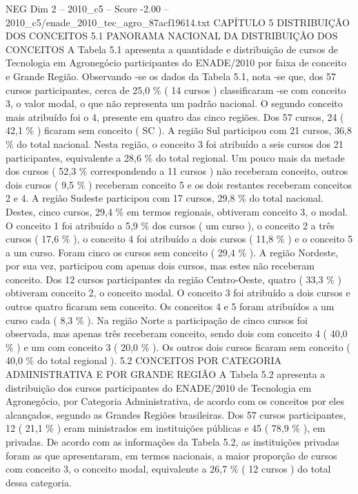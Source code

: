 \begin{textsample}{NEG Dim 2 – 2010\_c5 – Score -2.00 – 2010\_c5/enade\_2010\_tec\_agro\_87acf19614.txt}  \label{ex:f2_neg_103}
CAPÍTULO 5 DISTRIBUIÇÃO DOS CONCEITOS 5.1 PANORAMA NACIONAL DA DISTRIBUIÇÃO DOS CONCEITOS A Tabela 5.1 apresenta a quantidade e distribuição de cursos de Tecnologia em Agronegócio participantes do ENADE/2010 por faixa de conceito e Grande Região.
Observando -se os dados da Tabela 5.1, nota -se que, dos 57 cursos participantes, cerca de 25,0 \% ( 14 cursos ) classificaram -se com conceito 3, o valor modal, o que não representa um padrão nacional.
O segundo conceito mais atribuído foi o 4, presente em quatro das cinco regiões.
Dos 57 cursos, 24 ( 42,1 \% ) ficaram sem conceito ( SC ).
A região Sul participou com 21 cursos, 36,8 \% do total nacional.
Nesta região, o conceito 3 foi atribuído a seis cursos dos 21 participantes, equivalente a 28,6 \% do total regional.
Um pouco mais da metade dos cursos ( 52,3 \% correspondendo a 11 cursos ) não receberam conceito, outros dois cursos ( 9,5 \% ) receberam conceito 5 e os dois restantes receberam conceitos 2 e 4.
A região Sudeste participou com 17 cursos, 29,8 \% do total nacional.
Destes, cinco cursos, 29,4 \% em termos regionais, obtiveram conceito 3, o modal.
O conceito 1 foi atribuído a 5,9 \% dos cursos ( um curso ), o conceito 2 a três cursos ( 17,6 \% ), o conceito 4 foi atribuído a dois cursos ( 11,8 \% ) e o conceito 5 a um curso.
Foram cinco os cursos sem conceito ( 29,4 \% ).
A região Nordeste, por sua vez, participou com apenas dois cursos, mas estes não receberam conceito.
Dos 12 cursos participantes da região Centro-Oeste, quatro ( 33,3 \% ) obtiveram conceito 2, o conceito modal.
O conceito 3 foi atribuído a dois cursos e outros quatro ficaram sem conceito.
Os conceitos 4 e 5 foram atribuídos a um curso cada ( 8,3 \% ).
Na região Norte a participação de cinco cursos foi observada, mas apenas três receberam conceito, sendo dois com conceito 4 ( 40,0 \% ) e um com conceito 3 ( 20,0 \% ).
Os outros dois cursos ficaram sem conceito ( 40,0 \% do total regional ). 5.2 CONCEITOS POR CATEGORIA ADMINISTRATIVA E POR GRANDE REGIÃO A Tabela 5.2 apresenta a distribuição dos cursos participantes do ENADE/2010 de Tecnologia em Agronegócio, por Categoria Administrativa, de acordo com os conceitos por eles alcançados, segundo as Grandes Regiões brasileiras.
Dos 57 cursos participantes, 12 ( 21,1 \% ) eram ministrados em instituições públicas e 45 ( 78,9 \% ), em privadas.
De acordo com as informações da Tabela 5.2, as instituições privadas foram as que apresentaram, em termos nacionais, a maior proporção de cursos com conceito 3, o conceito modal, equivalente a 26,7 \% ( 12 cursos ) do total dessa categoria.

\end{textsample}

